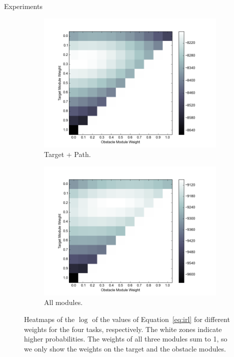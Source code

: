 \documentclass[final]{beamer}
\begin{document}
\begin{frame}{}
\begin{textblock}{37}
\begin{block}{Experiments}
\begin{figure}[h]
\begin{subfigure}[b]{0.24\textwidth}
\includegraphics[width=\textwidth]{objValuesTask3.png}
\caption{Target + Path. }
\end{subfigure}
\begin{subfigure}[b]{0.24\textwidth}
\includegraphics[width=\textwidth]{objValuesTask4.png}
\caption{All modules. }
\end{subfigure}
\caption{Heatmaps of the $\log$ of the values of Equation~\ref{eq:irl} for
different weights for the four tasks, respectively. The white zones indicate
higher probabilities. The weights of all three modules sum to 1, so we only show
the weights on the target and the obstacle modules.
}
\label{fig:heatmap}
\end{figure}
\end{block}
\end{textblock}

\end{frame}
\end{document}
